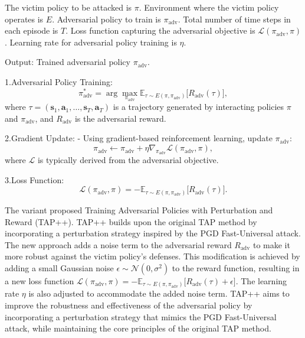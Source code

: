 The victim policy to be attacked is $\pi$.
Environment where the victim policy operates is $E$.
Adversarial policy to train is $\pi_{\text{adv}}$.
Total number of time steps in each episode is $T$.
Loss function capturing the adversarial objective is $\mathcal{L}(\pi_{\text{adv}}, \pi)$.
Learning rate for adversarial policy training is $\eta$.

Output: Trained adversarial policy $\pi_{\text{adv}}$.


1.Adversarial Policy Training:
   \[
   \pi_{\text{adv}}^* = \arg \max_{\pi_{\text{adv}}} \mathbb{E}_{\tau \sim E(\pi, \pi_{\text{adv}})} \Big[ R_{\text{adv}}(\tau) \Big],
   \]
   where $\tau = (\mathbf{s}_1, \mathbf{a}_1, \dots, \mathbf{s}_T, \mathbf{a}_T)$ is a trajectory generated by interacting policies $\pi$ and $\pi_{\text{adv}}$, and $R_{\text{adv}}$ is the adversarial reward.

2.Gradient Update:
   - Using gradient-based reinforcement learning, update $\pi_{\text{adv}}$:
     \[
     \pi_{\text{adv}} \leftarrow \pi_{\text{adv}} + \eta \nabla_{\pi_{\text{adv}}} \mathcal{L}(\pi_{\text{adv}}, \pi),
     \]
     where $\mathcal{L}$ is typically derived from the adversarial objective.

3.Loss Function:
   \[
   \mathcal{L}(\pi_{\text{adv}}, \pi) = -\mathbb{E}_{\tau \sim E(\pi, \pi_{\text{adv}})} \Big[ R_{\text{adv}}(\tau) \Big].
   \]

The variant proposed Training Adversarial Policies with Perturbation and Reward (TAP++). TAP++ builds upon the original TAP method by incorporating a perturbation strategy inspired by the PGD Fast-Universal attack. The new approach adds a noise term to the adversarial reward $R_{\text{adv}}$ to make it more robust against the victim policy's defenses. This modification is achieved by adding a small Gaussian noise $\epsilon \sim \mathcal{N}(0, \sigma^2)$ to the reward function, resulting in a new loss function $\mathcal{L}(\pi_{\text{adv}}, \pi) = -\mathbb{E}_{\tau \sim E(\pi, \pi_{\text{adv}})} \Big[ R_{\text{adv}}(\tau) + \epsilon \Big]$. The learning rate $\eta$ is also adjusted to accommodate the added noise term. TAP++ aims to improve the robustness and effectiveness of the adversarial policy by incorporating a perturbation strategy that mimics the PGD Fast-Universal attack, while maintaining the core principles of the original TAP method.